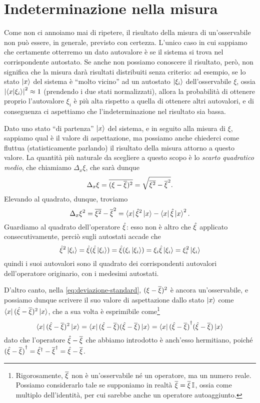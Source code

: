 \section{Indeterminazione nella misura}
Come non ci annoiamo mai di ripetere, il risultato della misura di un'osservabile non può essere, in generale, previsto con certezza.
L'unico caso in cui sappiamo che certamente otterremo un dato autovalore è se il sistema si trova nel corrispondente autostato.
Se anche non possiamo conoscere il risultato, però, non significa che la misura darà risultati distribuiti senza criterio: ad esempio, se lo stato $\left|{x}\right\rangle$ del sistema è ``molto vicino'' ad un autostato $\left|{\xi_i}\right\rangle$ dell'osservabile $\xi$, ossia $\left|{\left\langle{x}\middle|{\xi_i}\right\rangle}\right|^2\approx 1$ (prendendo i due stati normalizzati), allora la probabilità di ottenere proprio l'autovalore $\xi_i$ è più alta rispetto a quella di ottenere altri autovalori, e di conseguenza ci aspettiamo che l'indeterminazione nel risultato sia bassa.

Dato uno stato ``di partenza'' $\left|{x}\right\rangle$ del sistema, e in seguito alla misura di $\xi$, sappiamo qual è il valore di aspettazione, ma possiamo anche chiederci come fluttua (statisticamente parlando) il risultato della misura attorno a questo valore.
La quantità più naturale da scegliere a questo scopo è lo \emph{scarto quadratico medio}, che chiamiamo $\Delta_x\xi$, che sarà dunque
\begin{equation}
	\Delta_x\xi=\overline{(\xi-\overline{\xi})^2}=\sqrt{\overline{\xi^2}-\overline{\xi}^2}.
	\label{eq:deviazione-standard}
\end{equation}
Elevando al quadrato, dunque, troviamo
\begin{equation}
	\Delta_x\xi^2=\overline{\xi^2}-\overline{\xi}^2=\left\langle{x}\right|\hat{\xi}^2\left|{x}\right\rangle-\left\langle{x}\right|\hat{\xi}\left|{x}\right\rangle^2.
	\label{eq:varianza}
\end{equation}
Guardiamo al quadrato dell'operatore $\hat{\xi}$: esso non è altro che $\hat{\xi}$ applicato consecutivamente, perciò sugli autostati accade che
\begin{equation}
	\hat{\xi}^2\left|{\xi_i}\right\rangle=\hat{\xi}(\hat{\xi}\left|{\xi_i}\right\rangle)=\hat{\xi}(\xi_i\left|{\xi_i}\right\rangle)=\xi_i\hat{\xi}\left|{\xi_i}\right\rangle=\xi_i^2\left|{\xi_i}\right\rangle
\end{equation}
quindi i suoi autovalori sono il quadrato dei corrispondenti autovalori dell'operatore originario, con i medesimi autostati.

D'altro canto, nella \eqref{eq:deviazione-standard}, $(\xi-\overline{\xi})^2$ è ancora un'osservabile, e possiamo dunque scrivere il suo valore di aspettazione dallo stato $\left|{x}\right\rangle$ come $\left\langle{x}\right|(\hat{\xi}-\overline{\xi})^2\left|{x}\right\rangle$, che a sua volta è esprimibile come\footnote{Rigorosamente, $\overline{\xi}$ non è un'osservabile n\'e un operatore, ma un numero reale. Possiamo considerarlo tale se supponiamo in realtà $\overline{\xi}=\overline{\xi}\operatorname{\mathbb{I}}$, ossia come multiplo dell'identità, per cui sarebbe anche un operatore autoaggiunto.}
\begin{equation}
	\left\langle{x}\right|(\hat{\xi}-\overline{\xi})^2\left|{x}\right\rangle=\left\langle{x}\right|(\hat{\xi}-\overline{\xi})(\hat{\xi}-\overline{\xi})\left|{x}\right\rangle=\left\langle{x}\right|{(\hat{\xi}-\overline{\xi})}^\dagger(\hat{\xi}-\overline{\xi})\left|{x}\right\rangle
\end{equation}
dato che l'operatore $\hat{\xi}-\overline{\xi}$ che abbiamo introdotto è anch'esso hermitiano, poich\'e ${(\hat{\xi}-\overline{\xi})}^\dagger={\hat{\xi}}^\dagger-{\overline{\xi}}^\dagger=\hat{\xi}-\overline{\xi}$.

